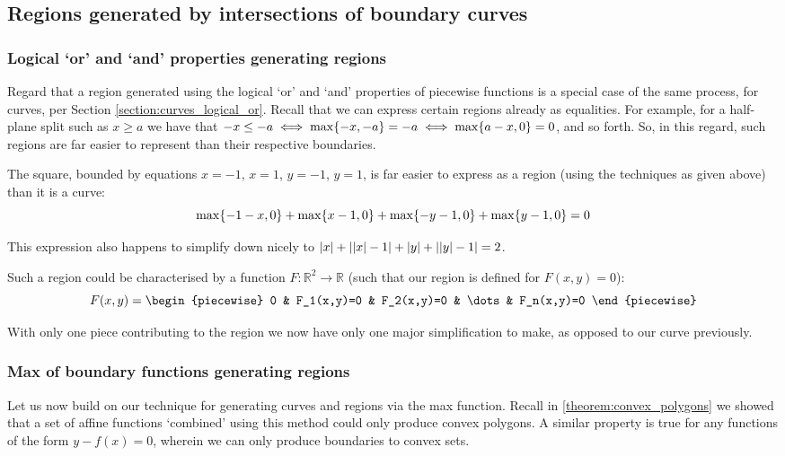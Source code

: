 \subsection{Regions generated by intersections of boundary curves}
\subsubsection{Logical `or' and `and' properties generating regions}
Regard that a region generated using the logical `or' and `and' properties of piecewise functions is a special case of the same process, for curves, per Section \ref{section:curves_logical_or}. Recall that we can express certain regions already as equalities. For example, for a half-plane split such as $x\geq a$ we have that $-x\leq -a\iff\max\{-x,-a\}=-a\iff\max\{a-x,0\}=0$, and so forth. So, in this regard, such regions are far easier to represent than their respective boundaries.

\begin{example}
    The square, bounded by equations $x=-1$, $x=1$, $y=-1$, $y=1$, is far easier to express as a region (using the techniques as given above) than it is a curve:
    $$
        \max\{-1-x,0\}+\max\{x-1,0\}+\max\{-y-1,0\}+\max\{y-1,0\}=0
    $$

    This expression also happens to simplify down nicely to $\abs{x}+\abs{\abs{x}-1}+\abs{y}+\abs{\abs{y}-1}=2$.
\end{example}

Such a region could be characterised by a function $F:\mathbb{R}^2\to\mathbb{R}$ (such that our region is defined for $F(x,y)=0$):
$$
    F(x,y)=\begin{piecewise}
        0 & F_1(x,y)=0 & F_2(x,y)=0 & \dots & F_n(x,y)=0
    \end{piecewise}
$$

With only one piece contributing to the region we now have only one major simplification to make, as opposed to our curve previously.

\subsubsection{Max of boundary functions generating regions}
\label{section:max_boundary_region}
Let us now build on our technique for generating curves and regions via the max function. Recall in \ref{theorem:convex_polygons} we showed that a set of affine functions `combined' using this method could only produce convex polygons. A similar property is true for any functions of the form $y-f(x)=0$, wherein we can only produce boundaries to convex sets.

